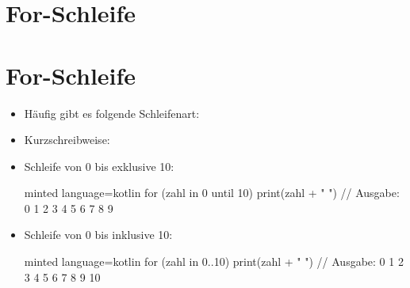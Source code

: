 \section{For-Schleife}
\subtitle{Kapitel 4: Befehle wiederholen}

\section{For-Schleife}
\begin{frame}
    \slidehead

    \begin{itemize}
        \item Häufig gibt es folgende Schleifenart:
            \pause
        \item Kurzschreibweise:
    \end{itemize}%
\end{frame}

\begin{frame}[fragile]
    \slidehead

    \begin{itemize}
        \item Schleife von 0 bis exklusive 10:
            \begin{codeBlock}[]{minted language=kotlin}
                for (zahl in 0 until 10) {
                    print(zahl + " ")
                } // Ausgabe: 0 1 2 3 4 5 6 7 8 9
            \end{codeBlock}
            \pause
        \item Schleife von 0 bis inklusive 10:
            \begin{codeBlock}[]{minted language=kotlin}
                for (zahl in 0..10) {
                    print(zahl + " ")
                } // Ausgabe: 0 1 2 3 4 5 6 7 8 9 10
            \end{codeBlock}
    \end{itemize}
\end{frame}

